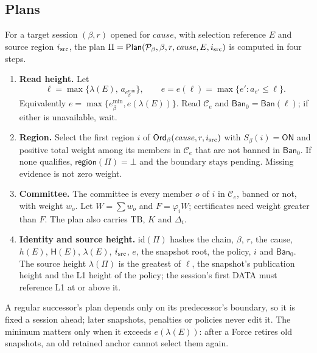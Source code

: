 \documentclass[11pt,a4paper]{article}
\newcommand{\Hash}{\mathsf H}
\newcommand{\tagg}[1]{\mathsf{#1}}
\newcommand{\cfg}{\mathcal C}
\newcommand{\Ban}{\mathsf{Ban}}
\newcommand{\emin}{e^{\min}}
\begin{document}
\subsection{Plans}
\label{sec:plan}
For a target session $(\beta,r)$ opened for $\mathit{cause}$, with
selection reference $E$ and source region $i_{\rm src}$, the plan
$\Pi=\tagg{Plan}(\mathcal P_\beta,\beta,r,\mathit{cause},E,i_{\rm src})$
is computed in four steps.
\begin{enumerate}[label=\textbf{\arabic*.},itemsep=3pt]
\item \textbf{Read height.} Let
\begin{equation}\label{eq:read}
 \ell=\max\{\lambda(E),\,a_{\emin_\beta}\},\qquad
 e=e(\ell)=\max\{e':a_{e'}\le\ell\}.
\end{equation}
Equivalently $e=\max\{\emin_\beta,e(\lambda(E))\}$. Read $\cfg_e$ and
$\Ban_0=\Ban(\ell)$; if either is unavailable, wait.
\item \textbf{Region.} Select the first region $i$ of
$\mathsf{Ord}_\beta(\mathit{cause},r,i_{\rm src})$ with
$S_\beta(i)=\tagg{ON}$ and positive total weight among its members in
$\cfg_e$ that are not banned in $\Ban_0$. If none qualifies,
$\tagg{region}(\Pi)=\bot$ and the boundary stays pending. Missing evidence
is not zero weight.
\item \textbf{Committee.} The committee is every member $o$ of $i$ in
$\cfg_e$, banned or not, with weight $w_o$. Let $W=\sum w_o$ and
$F=\varphi_iW$; certificates need weight greater than $F$. The plan also
carries $\mathrm{TB}$, $K$ and $\Delta_i$.
\item \textbf{Identity and source height.} $\mathrm{id}(\Pi)$ hashes the
chain, $\beta$, $r$, the cause, $h(E)$, $\Hash(E)$, $\lambda(E)$,
$i_{\rm src}$, $e$, the snapshot root, the policy, $i$ and $\Ban_0$. The
source height $\lambda(\Pi)$ is the greatest of $\ell$, the snapshot's
publication height and the L1 height of the policy; the session's first
DATA must reference L1 at or above it.
\end{enumerate}
A regular successor's plan depends only on its predecessor's boundary,
so it is fixed a session ahead; later snapshots, penalties or policies
never edit it. The minimum matters only when it exceeds $e(\lambda(E))$:
after a Force retires old snapshots, an old retained anchor cannot select
them again.
\end{document}
